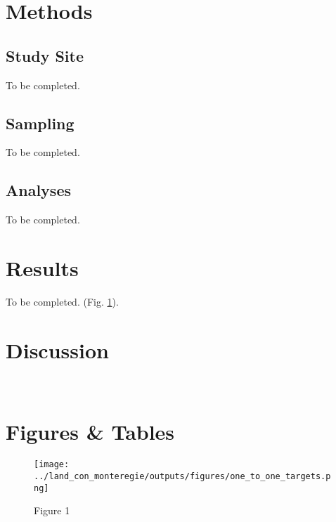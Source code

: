 \section{Methods}

\subsection*{Study Site}
To be completed.
\\
\subsection*{Sampling}
To be completed.
\\
\subsection*{Analyses}
To be completed.
\\
\section{Results}
To be completed.
(Fig. \ref{fig:map}).
\\
\section{Discussion}
\lipsum[66]
\\

\newpage
\section*{Figures \& Tables}

\begin{figure}[!ht]
  \centering
    \texttt{[image: ../land\_con\_monteregie/outputs/figures/one\_to\_one\_targets.png]}
  \caption{Figure 1}
  \label{fig:map}
\end{figure}

